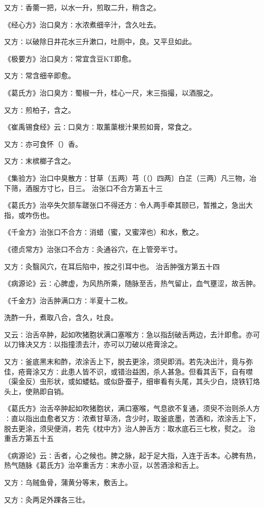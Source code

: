 \documentclass[a4paper,12pt,UTF8,twoside]{ctexbook}
\begin{document}
又方∶香薷一把，以水一升，煎取二升，稍含之。

《经心方》治口臭方∶水浓煮细辛汁，含久吐去。

又方∶以破除日井花水三升漱口，吐厕中，良。又平旦如此。

《极要方》治口臭方∶常宜含豆KT即愈。

又方∶常含细辛即愈。

《葛氏方》治口臭方∶蜀椒一升，桂心一尺，末三指撮，以酒服之。

又方∶煎柏子，含之。

《崔禹锡食经》云∶口臭方∶取薰蕖根汁果煎如膏，常食之。

又方∶亦可食怀（）香。

又方∶末槟榔子含之。

《集验方》治口中臭散方∶甘草（五两）芎〔（）四两〕白芷（三两）凡三物，冶下筛，酒服方寸匕，日三。
治张口不合方第五十三

《葛氏方》治卒失欠颔车蹉张口不得还方∶令人两手牵其颐已，暂推之，急出大指，或咋伤也。

《千金方》治张口不合方∶消蜡（蜜，又蜜滓也）和水，敷之。

《德贞常方》治张口不合方∶灸通谷穴，在上管旁半寸。

又方∶灸翳风穴，在耳后陷中，按之引耳中也。
治舌肿强方第五十四

《病源论》云∶心脾虚，为风热所乘，随脉至舌，热气留止，血气壅涩，故舌肿。

《千金方》治舌肿满口方∶半夏十二枚。

洗酢一升，煮取八合，含久，吐良。

又云∶治舌卒肿，起如吹猪胞状满口塞喉方∶急以指刮破舌两边，去汁即愈。亦可以刀锋决又方∶以指撞溃去汁，亦可以刀破以疮膏涂之。

又方∶釜底黑末和酢，浓涂舌上下，脱去更涂，须臾即消。若先决出汁，竟与弥佳，疮膏涂又方∶此患人皆不识，或错治益困，杀人甚急。但看其舌下，自有噤（渠金反）虫形状，或如蝼蛄。或似卧蚕子，细审看有头尾，其头少白，烧铁钉烙头上，使熟即自销。

《葛氏方》治舌卒肿起如吹猪胞状，满口塞喉，气息欲不复通，须臾不治则杀人方∶直以指出血愈者又方∶浓煮甘草汤，含少时，取釜底墨，苦酒和，浓涂舌上下，脱去更涂，须臾便消，若先《枕中方》治人肿舌方∶取水底石三七枚，熨之。
治重舌方第五十五

《病源论》云∶舌者，心之候也。脾之脉，起于足大指，入连于舌本。心脾有热，热气随脉《葛氏方》治卒重舌方∶末赤小豆，以苦酒涂和舌上。

又方∶乌贼鱼骨，蒲黄分等末，敷舌上。

又方∶灸两足外踝各三壮。
\end{document}
